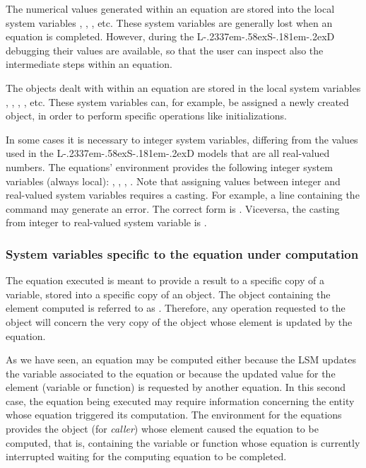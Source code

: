 \documentclass [11pt,a4paper] {book}
\def\LsD{{L\kern-.2337em\lower-.58ex\hbox{S}\kern-.181em\lower-.2ex\hbox{D}}\xspace}
\begin{document}
The numerical values generated within an equation are stored into the local system variables , , , etc. These system variables are generally lost when an equation is completed. However, during the \LsD debugging their values are available, so that the user can inspect also the intermediate steps within an equation.

The objects dealt with within an equation are stored in the local system variables , , , , etc. These system variables can, for example, be assigned a newly created object, in order to perform specific operations like initializations.

In some cases it is necessary to integer system variables, differing from the values used in the \LsD models that are all real-valued numbers. The equations' environment provides the following integer system variables (always local):  , , , . Note that assigning values between integer and real-valued system variables requires a casting. For example, a line containing the command  may generate an error. The correct form is . Viceversa, the casting from integer to real-valued system variable is .


\subsubsection{System variables specific to the equation under computation}

The equation executed is meant to provide a result to a specific copy of a variable, stored into a specific copy of an object. The object containing the element computed is referred to as . Therefore, any operation requested to the  object will concern the very copy of the object whose element is updated by the equation.

As we have seen, an equation may be computed either because the LSM updates the variable associated to the equation or because the updated value for the element (variable or function) is requested by another equation. In this second case, the equation being executed may require information concerning the entity whose equation triggered its computation. The environment for the equations provides the object  (for \textit{caller}) whose element caused the equation to be computed, that is, containing the variable or function whose equation is currently interrupted waiting for the computing equation to be completed.
\end{document}
